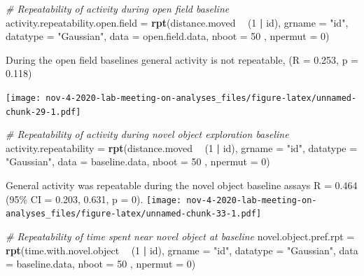 \documentclass[]{book}
\newenvironment{Shaded}{\begin{snugshade}}{\end{snugshade}}
\newcommand{\KeywordTok}[1]{\textcolor[rgb]{0.13,0.29,0.53}{\textbf{#1}}}
\newcommand{\DataTypeTok}[1]{\textcolor[rgb]{0.13,0.29,0.53}{#1}}
\newcommand{\DecValTok}[1]{\textcolor[rgb]{0.00,0.00,0.81}{#1}}
\newcommand{\StringTok}[1]{\textcolor[rgb]{0.31,0.60,0.02}{#1}}
\newcommand{\CommentTok}[1]{\textcolor[rgb]{0.56,0.35,0.01}{\textit{#1}}}
\newcommand{\OperatorTok}[1]{\textcolor[rgb]{0.81,0.36,0.00}{\textbf{#1}}}
\newcommand{\NormalTok}[1]{#1}
\begin{document}
\begin{Shaded}
\begin{Highlighting}[]
\CommentTok{# Repeatability of activity during open field baseline }
\NormalTok{activity.repeatability.open.field =}\StringTok{ }
\StringTok{  }\KeywordTok{rpt}\NormalTok{(distance.moved }\OperatorTok{~}\StringTok{ }\NormalTok{(}\DecValTok{1} \OperatorTok{|}\StringTok{ }\NormalTok{id), }\DataTypeTok{grname =} \StringTok{"id"}\NormalTok{, }\DataTypeTok{datatype =} \StringTok{"Gaussian"}\NormalTok{, }
      \DataTypeTok{data =}\NormalTok{ open.field.data, }\DataTypeTok{nboot =} \DecValTok{50}\NormalTok{ , }\DataTypeTok{npermut =} \DecValTok{0}\NormalTok{) }
\end{Highlighting}
\end{Shaded}

During the open field baselines general activity is not repeatable, (R =
0.253, p = 0.118)

\texttt{[image: nov-4-2020-lab-meeting-on-analyses\_files/figure-latex/unnamed-chunk-29-1.pdf]}

\begin{Shaded}
\begin{Highlighting}[]
\CommentTok{# Repeatability of activity during novel object exploration baseline }
\NormalTok{activity.repeatability =}\StringTok{ }
\StringTok{  }\KeywordTok{rpt}\NormalTok{(distance.moved }\OperatorTok{~}\StringTok{ }\NormalTok{(}\DecValTok{1} \OperatorTok{|}\StringTok{ }\NormalTok{id), }\DataTypeTok{grname =} \StringTok{"id"}\NormalTok{, }\DataTypeTok{datatype =} \StringTok{"Gaussian"}\NormalTok{, }
      \DataTypeTok{data =}\NormalTok{ baseline.data, }\DataTypeTok{nboot =} \DecValTok{50}\NormalTok{ , }\DataTypeTok{npermut =} \DecValTok{0}\NormalTok{)}
\end{Highlighting}
\end{Shaded}

General activity was repeatable during the novel object baseline assays
R = 0.464 (95\% CI = 0.203, 0.631, p = 0).
\texttt{[image: nov-4-2020-lab-meeting-on-analyses\_files/figure-latex/unnamed-chunk-33-1.pdf]}

\begin{Shaded}
\begin{Highlighting}[]
\CommentTok{# Repeatability of time spent near novel object at baseline }
\NormalTok{novel.object.pref.rpt =}\StringTok{ }
\StringTok{  }\KeywordTok{rpt}\NormalTok{(time.with.novel.object }\OperatorTok{~}\StringTok{ }\NormalTok{(}\DecValTok{1} \OperatorTok{|}\StringTok{ }\NormalTok{id), }\DataTypeTok{grname =} \StringTok{"id"}\NormalTok{, }\DataTypeTok{datatype =} \StringTok{"Gaussian"}\NormalTok{, }
      \DataTypeTok{data =}\NormalTok{ baseline.data, }\DataTypeTok{nboot =} \DecValTok{50}\NormalTok{ , }\DataTypeTok{npermut =} \DecValTok{0}\NormalTok{) }
\end{Highlighting}
\end{Shaded}
\end{document}
